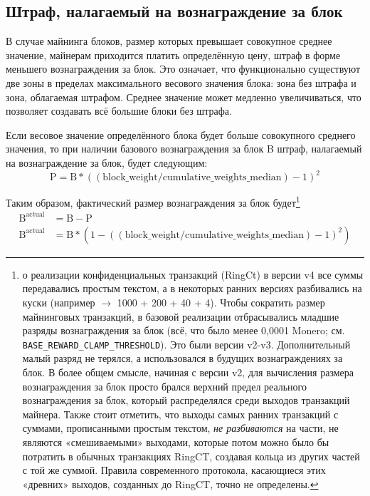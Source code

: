 \subsection{Штраф, налагаемый на вознаграждение за блок}
\label{subsec:penalty}

В случае майнинга блоков, размер которых превышает совокупное среднее значение, майне\-рам приходится платить определённую цену, штраф в форме меньшего вознаграждения за блок. Это означает, что функционально существуют две зоны в пределах максимального весового значения блока: зона без штрафа и зона, облагаемая штрафом. Среднее значение может медленно увеличиваться, что позволяет создавать всё большие блоки без штрафа.

Если весовое значение определённого блока будет больше совокупного среднего значения, то при наличии базового вознаграждения за блок B штраф, налагаемый на вознаграждение за блок, будет следующим:\vspace{.1cm}
\[\textrm{P} = \textrm{B}*((\textrm{block\_weight}/\textrm{cumulative\_weights\_median}) - 1)^2\]

Таким образом, фактический размер вознаграждения за блок будет\footnote{о реализации конфиденциальных транзакций (RingCt)  в версии v4 все суммы передавались простым текстом, а в некоторых ранних версиях разбивались на куски (например $\rightarrow$ 1000 + 200 + 40 + 4). Чтобы сократить размер майнинговых транзакций, в базовой реализации отбрасывались младшие разряды вознаграждения за блок (всё, что было менее 0,0001 Monero; см. {\tt BASE\_REWARD\_CLAMP\_THRESHOLD}). Это были версии v2-v3. Дополнительный малый разряд не терялся, а использовался в будущих вознаграждениях за блок. В более общем смысле, начиная с версии v2, для вычисления размера вознаграждения за блок просто брался верхний предел реального вознаграждения за блок, который распределялся среди выходов транзакций майнера. Также стоит отметить, что выходы самых ранних транзакций с суммами, прописанными простым текстом, {\em не разбиваются} на части, не являются «смешиваемыми» выходами, которые потом можно было бы потратить в обычных транзакциях RingCT, создавая кольца из других частей с той же суммой. Правила современного протокола, касающиеся этих «древних» выходов, созданных до RingCT, точно не определены.}\vspace{.3cm}
\begin{align*}
    \textrm{B}^{\textrm{actual}} &= \textrm{B} - \textrm{P} \\
    \textrm{B}^{\textrm{actual}} &= \textrm{B}*(1-((\textrm{block\_weight}/\textrm{cumulative\_weights\_median}) - 1)^2)
\end{align*}

